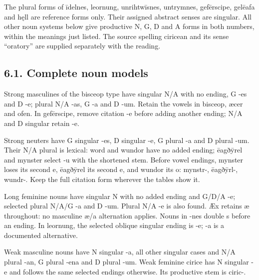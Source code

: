 The plural forms of īdelnes, leornung, unrihtwīsnes, untrymnes, gefērscipe, gelēafa and hęll are reference forms only. Their assigned abstract senses are singular. All other noun systems below give productive N, G, D and A forms in both numbers, within the meanings just listed. The source spelling ciricean and its sense “oratory” are supplied separately with the reading.

\subsection*{6.1. Complete noun models}

Strong masculines of the bisceop type have singular N/\allowbreak{}A with no ending, G -es and D -e; plural N/\allowbreak{}A -as, G -a and D -um. Retain the vowels in bisceop, æcer and ofen. In gefērscipe, remove citation -e before adding another ending; N/\allowbreak{}A and D singular retain -e.

Strong neuters have G singular -es, D singular -e, G plural -a and D plural -um. Their N/\allowbreak{}A plural is lexical: word and wundor have no added ending; ēagðȳrel and mynster select -u with the shortened stem. Before vowel endings, mynster loses its second e, ēagðȳrel its second e, and wundor its o: mynstr-, ēagðȳrl-, wundr-. Keep the full citation form wherever the tables show it.

Long feminine nouns have singular N with no added ending and G/\allowbreak{}D/\allowbreak{}A -e; selected plural N/\allowbreak{}A/\allowbreak{}G -a and D -um. Plural N/\allowbreak{}A -e is also found. Æx retains æ throughout: no masculine æ/\allowbreak{}a alternation applies. Nouns in -nes double s before an ending. In leornung, the selected oblique singular ending is -e; -a is a documented alternative.

Weak masculine nouns have N singular -a, all other singular cases and N/\allowbreak{}A plural -an, G plural -ena and D plural -um. Weak feminine cirice has N singular -e and follows the same selected endings otherwise. Its productive stem is ciric-.

